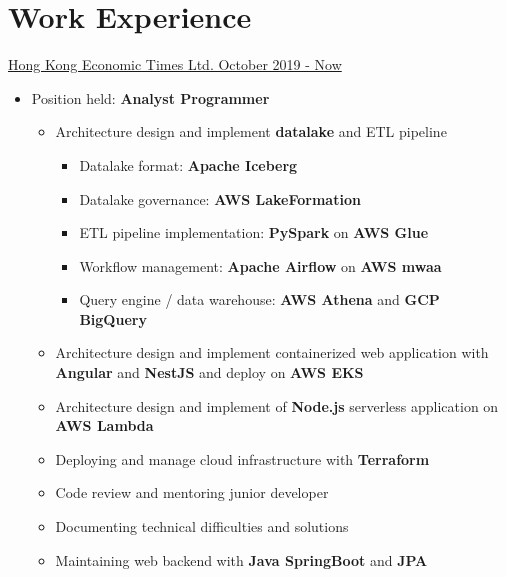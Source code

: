 \documentclass[a4paper,12pt]{article}
\begin{document}
  \title{}
  \author{\Large Victor PANG, Ka Wing \\ Email: \href{mailto:pkwww.2000@gmail.com}{pkwww.2000@gmail.com} \\ GitHub: \href{https://github.com/pkwww}{https://github.com/pkwww}  \\ Phone: +852 65489919}%
  \date{}
  \maketitle

  \section*{Work Experience}
  \uline{Hong Kong Economic Times Ltd. \hfill October 2019 - Now}
  \begin{itemize}
    \item Position held: \textbf{Analyst Programmer}
    \begin{itemize}
      \item Architecture design and implement \textbf{datalake} and ETL pipeline
        \begin{itemize}
          \item Datalake format: \textbf{Apache Iceberg}
          \item Datalake governance: \textbf{AWS LakeFormation}
          \item ETL pipeline implementation: \textbf{PySpark} on \textbf{AWS Glue}
          \item Workflow management: \textbf{Apache Airflow} on \textbf{AWS mwaa}
          \item Query engine / data warehouse: \textbf{AWS Athena} and \textbf{GCP BigQuery}
        \end{itemize}
      \item Architecture design and implement containerized web application with \textbf{Angular} and \textbf{NestJS} and deploy on \textbf{AWS EKS}
      \item Architecture design and implement of \textbf{Node.js} serverless application on \textbf{AWS Lambda}
      \item Deploying and manage cloud infrastructure with \textbf{Terraform}
      \item Code review and mentoring junior developer
      \item Documenting technical difficulties and solutions
      \item Maintaining web backend with \textbf{Java SpringBoot} and \textbf{JPA}
    \end{itemize}
  \end{itemize}
\end{document}
